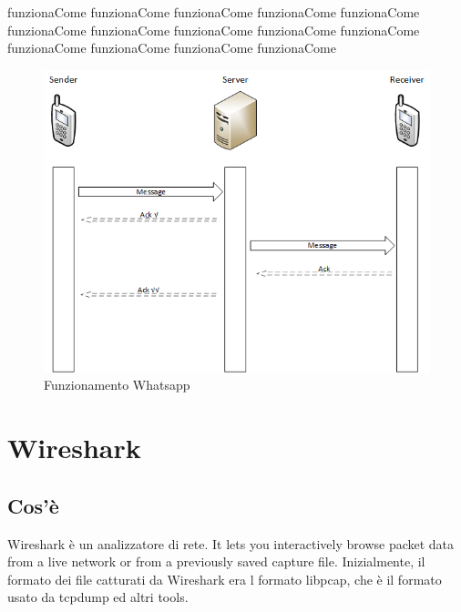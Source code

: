 \documentclass[a4paper,11pt]{book}
\begin{document}
funzionaCome funzionaCome funzionaCome funzionaCome funzionaCome funzionaCome funzionaCome funzionaCome funzionaCome funzionaCome funzionaCome funzionaCome funzionaCome funzionaCome 
\begin{figure}[h!t]
\centering
\includegraphics[scale = 0.7]{rete.png}
\caption{Funzionamento Whatsapp}
\end{figure}


\clearpage

\section{Wireshark}
\subsection{Cos'è}
Wireshark è un analizzatore di rete. It lets you interactively browse packet data from a live network or from a previously saved capture file. Inizialmente, il formato dei file catturati da Wireshark era l formato libpcap, che è il formato usato da tcpdump ed altri tools.

~
\end{document}
